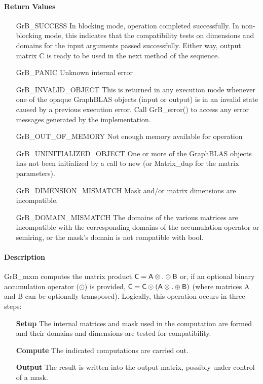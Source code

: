 \paragraph{Return Values}

\begin{itemize}[leftmargin=2.1in]
	\item[{\sf GrB\_SUCCESS}]	      In blocking mode, operation
	completed successfully. In non-blocking mode, this indicates
	that the compatibility tests on dimensions and domains for the
	input arguments passed successfully. Either way, output matrix
	{\sf C} is ready to be used in the next method of the sequence.

	\item[{\sf GrB\_PANIC}]		      Unknown internal error

    \item[{\sf GrB\_INVALID\_OBJECT}] This is returned in any execution mode 
    whenever one of the opaque GraphBLAS objects (input or output) is in an invalid 
    state caused by a previous execution error.  Call {GrB\_error()} to access 
    any error messages generated by the implementation.

	\item[{\sf GrB\_OUT\_OF\_MEMORY}]	      Not enough memory available
	for operation
    
    \item[{\sf GrB\_UNINITIALIZED\_OBJECT}]  One or more of the GraphBLAS 
    objects has not been initialized by a call to {\sf new} (or 
    {\sf Matrix\_dup} for the matrix parameters).
    
	\item[{\sf GrB\_DIMENSION\_MISMATCH}] Mask and/or matrix dimensions are
	incompatible.

	\item[{\sf GrB\_DOMAIN\_MISMATCH}]    The domains of the various
	matrices are incompatible with the corresponding domains of the
	accumulation operator or semiring, or the mask's domain is not compatible with bool.
\end{itemize}

\paragraph{Description}

{\sf GrB\_mxm} computes the matrix product ${\sf C} = {\sf
A} \otimes . \oplus {\sf B}$ or, if an optional binary accumulation
operator ($\odot$) is provided, ${\sf C} = {\sf C} \odot
\left({\sf A} \otimes . \oplus {\sf B}\right)$ (where matrices {\sf A}
and {\sf B} can be optionally transposed).  Logically, this operation
occurs in three steps:
\begin{enumerate}[leftmargin=0.75in]
\item[\bf Setup] The internal matrices and mask used in the computation are formed and their 
domains and dimensions are tested for compatibility.
\item[\bf Compute] The indicated computations are carried out.
\item[\bf Output] The result is written into the output matrix, possibly under control of a mask.
\end{enumerate}

